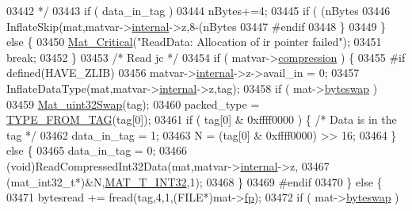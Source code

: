 \begin{DoxyCode}
{{{{{{{{{{{{{{{{{{03442 \textcolor{comment}{                     */}
03443                     \textcolor{keywordflow}{if} ( data\_in\_tag )
03444                         nBytes+=4;
03445                     \textcolor{keywordflow}{if} ( (nBytes %
03446                         InflateSkip(mat,matvar->\hyperlink{group___m_a_t_a6e97e3ed9f40c49322c18561c2a94e92}{internal}->z,8-(nBytes %
03447 \textcolor{preprocessor}{#endif}
03448                 \}
03449             \} \textcolor{keywordflow}{else} \{
03450                 \hyperlink{group__mat__util_gaf51f2bfbb5580f575e4dd79757e2b80c}{Mat\_Critical}(\textcolor{stringliteral}{"ReadData: Allocation of ir pointer failed"});
03451                 \textcolor{keywordflow}{break};
03452             \}
03453             \textcolor{comment}{/*  Read jc    */}
03454             \textcolor{keywordflow}{if} ( matvar->\hyperlink{group___m_a_t_aeef0466048621cb2c959ba7f6c774d06}{compression} ) \{
03455 \textcolor{preprocessor}{#if defined(HAVE\_ZLIB)}
03456                 matvar->\hyperlink{group___m_a_t_a6e97e3ed9f40c49322c18561c2a94e92}{internal}->z->avail\_in = 0;
03457                 InflateDataType(mat,matvar->\hyperlink{group___m_a_t_a6e97e3ed9f40c49322c18561c2a94e92}{internal}->z,tag);
03458                 \textcolor{keywordflow}{if} ( mat->\hyperlink{struct__mat__t_a99d207977af5e04941ace56d71817a40}{byteswap} )
03459                     \hyperlink{endian_8c_a8cb0d0750e2eaf9840d95db531934f4f}{Mat\_uint32Swap}(tag);
03460                 packed\_type = \hyperlink{mat5_8c_a82bacecc4afc633b61bc3dc8ef88d1ed}{TYPE\_FROM\_TAG}(tag[0]);
03461                 \textcolor{keywordflow}{if} ( tag[0] & 0xffff0000 ) \{ \textcolor{comment}{/* Data is in the tag */}
03462                     data\_in\_tag = 1;
03463                     N = (tag[0] & 0xffff0000) >> 16;
03464                 \} \textcolor{keywordflow}{else} \{
03465                     data\_in\_tag = 0;
03466                     (void)ReadCompressedInt32Data(mat,matvar->\hyperlink{group___m_a_t_a6e97e3ed9f40c49322c18561c2a94e92}{internal}->z,
03467                              (mat\_int32\_t*)&N,\hyperlink{group___m_a_t_ggacf7b3b879282b7ab3a51190e49bf3453a83e06a68320726c6572bfbb9f3addb1d}{MAT\_T\_INT32},1);
03468                 \}
03469 \textcolor{preprocessor}{#endif}
03470             \} \textcolor{keywordflow}{else} \{
03471                 bytesread += fread(tag,4,1,(FILE*)mat->\hyperlink{struct__mat__t_a85f562e407ca9ad4d2a6e14f839432b7}{fp});
03472                 \textcolor{keywordflow}{if} ( mat->\hyperlink{struct__mat__t_a99d207977af5e04941ace56d71817a40}{byteswap} )
}}}}}}}}}}}}}}}}}}
\end{DoxyCode}

